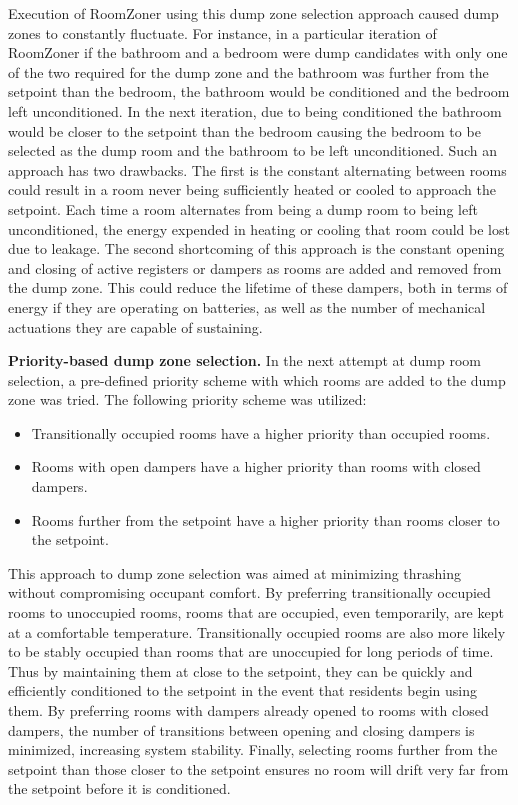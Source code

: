 Execution of RoomZoner using this dump zone selection approach caused dump zones
to constantly fluctuate. For instance, in a particular iteration of RoomZoner if
the bathroom and a bedroom were dump candidates with only one of the two
required for the dump zone and the bathroom was further from the setpoint than
the bedroom, the bathroom would be conditioned and the bedroom left
unconditioned. In the next iteration, due to being conditioned the bathroom
would be closer to the setpoint than the bedroom causing the bedroom to be
selected as the dump room and the bathroom to be left unconditioned. Such an
approach has two drawbacks. The first is the constant alternating between rooms
could result in a room never being sufficiently heated or cooled to approach the
setpoint. Each time a room alternates from being a dump room to being left
unconditioned, the energy expended in heating or cooling that room could be lost
due to leakage. The second shortcoming of this approach is the constant opening
and closing of active registers or dampers as rooms are added and removed from
the dump zone. This could reduce the lifetime of these dampers, both in terms of
energy if they are operating on batteries, as well as the number of mechanical
actuations they are capable of sustaining.

\par {\bf Priority-based dump zone selection. } In the next attempt at dump room
selection, a pre-defined priority scheme with which rooms are added to the dump
zone was tried. The following priority scheme was utilized:
\begin{itemize}
\item Transitionally occupied rooms have a higher priority than occupied rooms.
\item Rooms with open dampers have a higher priority than rooms with closed
  dampers.
\item Rooms further from the setpoint have a higher priority than rooms closer
  to the setpoint.
\end{itemize}
This approach to dump zone selection was aimed at minimizing thrashing without
compromising occupant comfort. By preferring transitionally occupied rooms to
unoccupied rooms, rooms that are occupied, even temporarily, are kept at a
comfortable temperature. Transitionally occupied rooms are also more likely to
be stably occupied than rooms that are unoccupied for long periods of time. Thus
by maintaining them at close to the setpoint, they can be quickly and
efficiently conditioned to the setpoint in the event that residents begin using
them. By preferring rooms with dampers already opened to rooms with closed
dampers, the number of transitions between opening and closing dampers is
minimized, increasing system stability. Finally, selecting rooms further from
the setpoint than those closer to the setpoint ensures no room will drift very
far from the setpoint before it is conditioned. 

